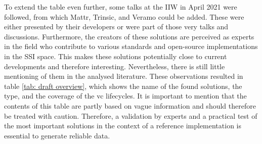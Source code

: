     To extend the table even further, some talks at the \ac{IIW} in April 2021 \cite{iiw_contributors_iiw_2021} were followed, from which Mattr, Trinsic, and Veramo could be added. These were either presented by their developers or were part of those very talks and discussions. Furthermore, the creators of these solutions are perceived as experts in the field who  contribute to various standards and open-source implementations in the \ac{SSI} space. This makes these solutions potentially close to current developments and therefore interesting. Nevertheless, there is still little mentioning of them in the analysed literature. These observations resulted in table \ref{tab: draft overview}, which shows the name of the found solutions, the type, and the coverage of the \ac{vc} lifecycles. It is important to mention that the contents of this table are partly based on vague information and should therefore be treated with caution. Therefore, a validation by experts and a practical test of the most important solutions in the context of a reference implementation is essential to generate reliable data.

